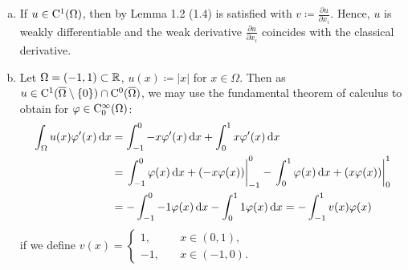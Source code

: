 \begin{ex}
  \begin{enumerate}[a)]
    \item If $u \in \mathrm{C}^1(\Omega)$, then by Lemma 1.2 (1.4) is satisfied with $v \coloneqq \frac{\partial u}{\partial x_i}$.
      Hence, $u$ is weakly differentiable and the weak derivative $\frac{\partial u}{\partial x_i}$ coincides with the classical derivative.
    \item Let $\Omega = (-1,1) \subset \mathbb{R}$, $u(x) \coloneqq |x|$ for $x \in \Omega$.
      Then as $u \in \mathrm{C}^1(\overline \Omega \setminus \{0\}) \cap \mathrm{C}^0(\overline \Omega)$, we may use the fundamental theorem of calculus to obtain for $\varphi \in \mathrm{C}_0^\infty(\Omega)$:
      \begin{align*}
        \int_\Omega u(x) \varphi^\prime(x) \, {\operatorname{d}\!{x}} 
        &= \int_{-1}^0 -x \varphi^\prime(x) \, {\operatorname{d}\!{x}} + \int_0^1 x \varphi^\prime(x) \, {\operatorname{d}\!{x}} \\
        &= \left.\int_{-1}^0 \varphi(x) \, {\operatorname{d}\!{x}} + (-x \varphi(x))\right|_{-1}^0 - \left.\int_0^1 \varphi(x) \, {\operatorname{d}\!{x}} + (x \varphi(x))\right|_0^1 \\
        &= -\int_{-1}^0 -1 \varphi(x) \, {\operatorname{d}\!{x}} - \int_0^1 1 \varphi(x) \, {\operatorname{d}\!{x}}
        = -\int_{-1}^1 v(x) \varphi(x)
      \end{align*}
      if we define $v(x) = \begin{cases} 1, \quad &x \in (0,1), \\ -1, \quad &x \in (-1,0). \end{cases}$


\end{enumerate}
\end{ex}
